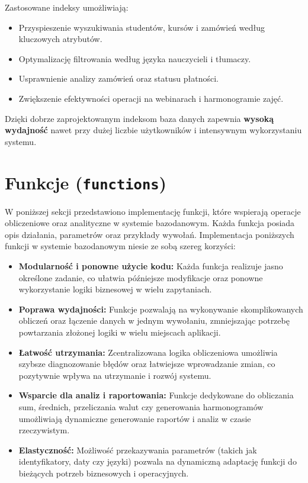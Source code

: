 \documentclass[12pt]{article}
\begin{document}
\noindent Zastosowane indeksy umożliwiają:
\begin{itemize}
    \item Przyspieszenie wyszukiwania studentów, kursów i zamówień według kluczowych atrybutów.
    \item Optymalizację filtrowania według języka nauczycieli i tłumaczy.
    \item Usprawnienie analizy zamówień oraz statusu płatności.
    \item Zwiększenie efektywności operacji na webinarach i harmonogramie zajęć.
\end{itemize}

\noindent Dzięki dobrze zaprojektowanym indeksom baza danych zapewnia \textbf{wysoką wydajność} nawet przy dużej liczbie użytkowników i intensywnym wykorzystaniu systemu.


\newpage
\section{Funkcje (\texttt{functions})}

W poniższej sekcji przedstawiono implementację funkcji, które wspierają operacje obliczeniowe oraz analityczne w systemie bazodanowym. Każda funkcja posiada opis działania, parametrów oraz przykłady wywołań. Implementacja poniższych funkcji w systemie bazodanowym niesie ze sobą szereg korzyści:

\begin{itemize}
    \item \textbf{Modularność i ponowne użycie kodu:} Każda funkcja realizuje jasno określone zadanie, co ułatwia późniejsze modyfikacje oraz ponowne wykorzystanie logiki biznesowej w wielu zapytaniach.
    \item \textbf{Poprawa wydajności:} Funkcje pozwalają na wykonywanie skomplikowanych obliczeń oraz łączenie danych w jednym wywołaniu, zmniejszając potrzebę powtarzania złożonej logiki w wielu miejscach aplikacji.
    \item \textbf{Łatwość utrzymania:} Zcentralizowana logika obliczeniowa umożliwia szybsze diagnozowanie błędów oraz łatwiejsze wprowadzanie zmian, co pozytywnie wpływa na utrzymanie i rozwój systemu.
    \item \textbf{Wsparcie dla analiz i raportowania:} Funkcje dedykowane do obliczania sum, średnich, przeliczania walut czy generowania harmonogramów umożliwiają dynamiczne generowanie raportów i analiz w czasie rzeczywistym.
    \item \textbf{Elastyczność:} Możliwość przekazywania parametrów (takich jak identyfikatory, daty czy języki) pozwala na dynamiczną adaptację funkcji do bieżących potrzeb biznesowych i operacyjnych.
\end{itemize}
\end{document}
